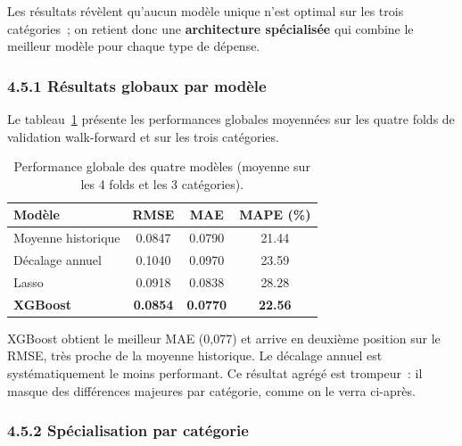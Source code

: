 Les r\'esultats r\'ev\`elent qu'aucun mod\`ele unique n'est optimal sur les trois
cat\'egories~; on retient donc une \textbf{architecture sp\'ecialis\'ee} qui combine
le meilleur mod\`ele pour chaque type de d\'epense.

\subsubsection*{4.5.1 \quad R\'esultats globaux par mod\`ele}

Le tableau~\ref{tab:global} pr\'esente les performances globales moyenn\'ees sur les
quatre folds de validation walk-forward et sur les trois cat\'egories.

\begin{table}[H]
\centering\small
\caption{Performance globale des quatre mod\`eles (moyenne sur les 4 folds et les 3 cat\'egories).}
\label{tab:global}
\begin{tabular}{@{}lccc@{}}
\toprule
\textbf{Mod\`ele} & \textbf{RMSE} & \textbf{MAE} & \textbf{MAPE (\%)} \\
\midrule
Moyenne historique & 0.0847 & 0.0790 & 21.44 \\
D\'ecalage annuel  & 0.1040 & 0.0970 & 23.59 \\
Lasso              & 0.0918 & 0.0838 & 28.28 \\
\textbf{XGBoost}   & \textbf{0.0854} & \textbf{0.0770} & \textbf{22.56} \\
\bottomrule
\end{tabular}
\end{table}

\noindent
XGBoost obtient le meilleur MAE (0{,}077) et arrive en deuxi\`eme position sur le
RMSE, tr\`es proche de la moyenne historique. Le d\'ecalage annuel est syst\'ematiquement
le moins performant. Ce r\'esultat agr\'eg\'e est trompeur~: il masque des diff\'erences
majeures par cat\'egorie, comme on le verra ci-apr\`es.

\subsubsection*{4.5.2 \quad Sp\'ecialisation par cat\'egorie}


